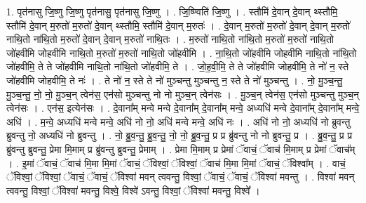 \documentclass[17pt]{extarticle}
\begin{document}
1. पृत॑नासु जि॒ष्णु जि॒ष्णु पृत॑नासु॒ पृत॑नासु जि॒ष्णु । . जि॒ष्ण्विति॑ जि॒ष्णु । . स्तौमि॑ दे॒वान् दे॒वान् थ्स्तौमि॒ स्तौमि॑ दे॒वान् म॒रुतो॑ म॒रुतो॑ दे॒वान् थ्स्तौमि॒ स्तौमि॑ दे॒वान् म॒रुतः॑ । . दे॒वान् म॒रुतो॑ म॒रुतो॑ दे॒वान् दे॒वान् म॒रुतो॑ नाथि॒तो ना॑थि॒तो म॒रुतो॑ दे॒वान् दे॒वान् म॒रुतो॑ नाथि॒तः । . म॒रुतो॑ नाथि॒तो ना॑थि॒तो म॒रुतो॑ म॒रुतो॑ नाथि॒तो जो॑हवीमि जोहवीमि नाथि॒तो म॒रुतो॑ म॒रुतो॑ नाथि॒तो जो॑हवीमि । . ना॒थि॒तो जो॑हवीमि जोहवीमि नाथि॒तो ना॑थि॒तो जो॑हवीमि॒ ते ते जो॑हवीमि नाथि॒तो ना॑थि॒तो जो॑हवीमि॒ ते । . जो॒ह॒वी॒मि॒ ते ते जो॑हवीमि जोहवीमि॒ ते नो॑ न॒ स्ते जो॑हवीमि जोहवीमि॒ ते नः॑ । . ते नो॑ न॒ स्ते ते नो॑ मुञ्चन्तु मुञ्चन्तु न॒ स्ते ते नो॑ मुञ्चन्तु । . नो॒ मु॒ञ्च॒न्तु॒ मु॒ञ्च॒न्तु॒ नो॒ नो॒ मु॒ञ्च॒न् त्वेन॑स॒ एन॑सो मुञ्चन्तु नो नो मुञ्च॒न् त्वेन॑सः । . मु॒ञ्च॒न् त्वेन॑स॒ एन॑सो मुञ्चन्तु मुञ्च॒न् त्वेन॑सः । . एन॑स॒ इत्येन॑सः । . दे॒वाना᳚म् मन्वे मन्वे दे॒वाना᳚म् दे॒वाना᳚म् मन्वे॒ अध्यधि॑ मन्वे दे॒वाना᳚म् दे॒वाना᳚म् मन्वे॒ अधि॑ । . म॒न्वे॒ अध्यधि॑ मन्वे मन्वे॒ अधि॑ नो नो॒ अधि॑ मन्वे मन्वे॒ अधि॑ नः । . अधि॑ नो नो॒ अध्यधि॑ नो ब्रुवन्तु ब्रुवन्तु नो॒ अध्यधि॑ नो ब्रुवन्तु । . नो॒ ब्रु॒व॒न्तु॒ ब्रु॒व॒न्तु॒ नो॒ नो॒ ब्रु॒व॒न्तु॒ प्र प्र ब्रु॑वन्तु नो नो ब्रुवन्तु॒ प्र । . ब्रु॒व॒न्तु॒ प्र प्र ब्रु॑वन्तु ब्रुवन्तु॒ प्रेमा मि॒माम् प्र ब्रु॑वन्तु ब्रुवन्तु॒ प्रेमाम् । . प्रेमा मि॒माम् प्र प्रेमां ॅवाचं॒ ॅवाच॑ मि॒माम् प्र प्रेमां ॅवाच᳚म् । . इ॒मां ॅवाचं॒ ॅवाच॑ मि॒मा मि॒मां ॅवाचं॒ ॅविश्वां॒ ॅविश्वां॒ ॅवाच॑ मि॒मा मि॒मां ॅवाचं॒ ॅविश्वा᳚म् । . वाचं॒ ॅविश्वां॒ ॅविश्वां॒ ॅवाचं॒ ॅवाचं॒ ॅविश्वा॑ मवन् त्ववन्तु॒ विश्वां॒ ॅवाचं॒ ॅवाचं॒ ॅविश्वा॑ मवन्तु । . विश्वा॑ मवन् त्ववन्तु॒ विश्वां॒ ॅविश्वा॑ मवन्तु॒ विश्वे॒ विश्वे॑ ऽवन्तु॒ विश्वां॒ ॅविश्वा॑ मवन्तु॒ विश्वे᳚ । \newline
\end{document}
